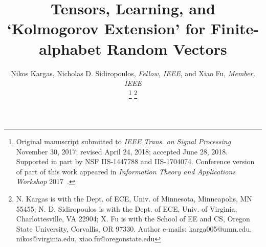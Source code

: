 \documentclass[journal]{IEEEtran}
\begin{document}
\title{Tensors, Learning, and `Kolmogorov Extension' for Finite-alphabet Random Vectors}
\vspace{-5mm}
\author{Nikos Kargas, Nicholas D. Sidiropoulos, \emph{Fellow, IEEE}, and Xiao Fu, \emph{Member, IEEE}
	
	
	\thanks{Original manuscript submitted to {\it IEEE Trans. on Signal Processing} November 30, 2017; revised April 24, 2018; accepted June 28, 2018. Supported in part by NSF IIS-1447788 and IIS-1704074. Conference version of part of this work appeared in \textit{Information Theory and Applications Workshop} 2017~\cite{KaSi2017}.}
	\thanks{N. Kargas is with the Dept. of ECE, Univ. of Minnesota, Minneapolis, MN 55455; N. D. Sidiropoulos is with the Dept. of ECE, Univ. of Virginia, Charlottesville, VA 22904; X. Fu is with the School of EE and CS, Oregon State University, Corvallis, OR 97330. Author e-mails: karga005@umn.edu, nikos@virginia.edu, xiao.fu@oregonstate.edu}
	}
	\vspace{-5mm}
\maketitle
\end{document}
